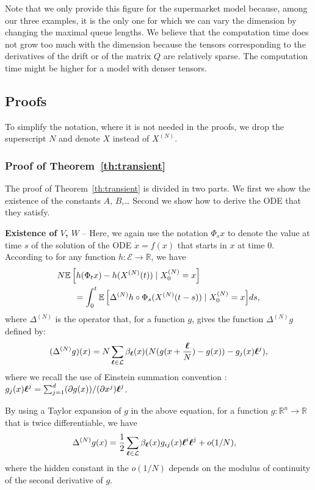 \documentclass[sigconf]{acmart}
\newcommand\XN{X^{(N)}}
\newcommand\DeltaN{\Delta^{(N)}}
\newcommand\bl{{\text{\boldmath$\ell$}}}
\newcommand\E{\mathcal{E}}
\newcommand\R{\mathbb{R}}
\newcommand\calL{\mathcal{L}}
\newcommand\esp[1]{{\mathchoice{\besp{#1}}{\sesp{#1}}{\sesp{#1}}{\sesp{#1}}}}
\newcommand\besp[1]{\mathbb{E}\left[#1\right]}
\newcommand\sesp[1]{\mathbb{E}[#1]}
\begin{document}
Note that we only provide this figure for the supermarket model
because, among our three examples, it is the only one for which we can
vary the dimension by changing the maximal queue
lengths. We believe that the computation time does not grow too much
with the dimension because the tensors corresponding to the
derivatives of the drift or of the matrix $Q$ are relatively
sparse. The computation time might be higher for a model with denser
tensors.  


\subsection{Proofs}
\label{ssec:proofs}

To simplify the notation, where it is not needed in the proofs, we
drop the superscript $N$ and denote $X$ instead of $\XN$.

\subsubsection{Proof of Theorem~\ref{th:transient}}

The proof of Theorem~\ref{th:transient} is divided in two parts. We
first we show the existence of the constants $A$, $B$,\dots{} Second
we show how to derive the ODE that they satisfy.

\textbf{Existence of $V$, $W$} -- Here, we again use the notation
$\Phi_sx$ to denote the value at time $s$ of the solution of the ODE
$\dot{x}=f(x)$ that starts in $x$ at time $0$.  According to
\cite[Equation~(19)]{gast2017expected} for any function $h:\E\to\R$,
we have
  \begin{align}
    &N\esp{h(\Phi_tx)-h(\XN(t)) \mid \XN_0=x}\nonumber\\
    &\qquad=\int_0^t\esp{\DeltaN h\circ\Phi_s(\XN(t-s))\mid
      \XN_0=x}ds,
      \label{eq:deltaN_transient}
  \end{align}
  where $\DeltaN$ is the operator that, for a function $g$, gives the function $\DeltaN g$ defined by: 
  \begin{align}
    \label{eq:deltaN}
    (\DeltaN g) (x) = N\sum_{\bl\in\calL} \beta_{\bl}(x) (N(g(x+\frac\bl
    N)-g(x))-g_j(x)\bl^j),
  \end{align}
  where we recall the use of Einstein summation convention :
  $g_j(x)\bl^j=\sum_{j=1}^d(\partial g(x)) / (\partial x^j)\bl^j$.
  
  By using a Taylor expansion of $g$ in the above equation, for a
  function $g:\R^n\to\R$ that is twice differentiable, we have
  \begin{align}
    \label{eq:deltaN_dev1}
    \DeltaN g (x) &=\frac12\sum_{\bl\in\calL} \beta_{\bl}(x)
                    g_{ij}(x)\bl^i\bl^j + o(1/N),
  \end{align}
  where the hidden constant in the $o(1/N)$ depends on the modulus of
  continuity of the second derivative of $g$. 
  
\end{document}
